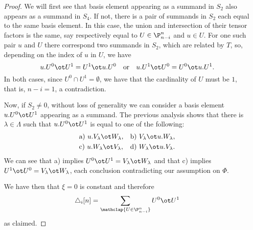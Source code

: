 \begin{proof}
	We will first see that basis element appearing as a summand in $S_2$ also appears as a summand in $S_4$.
	If not, there is a pair of summands in $S_2$ each equal to the same basis element.
	In this case, the union and intersection of their tensor factors is the same, say respectively equal to $U \in \P_{n-i}^n$ and $u \in U$.
	For one such pair $u$ and $U$ there correspond two summands in $S_2$, which are related by $T$, so, depending on the index of $u$ in $U$, we have
	\[
	u.U^0 \ot U^1 = U^1 \ot u.U^0 \quad \text{or} \quad
	u.U^1 \ot U^0 = U^0 \ot u.U^1.
	\]
	In both cases, since $U^0 \cap U^1 = \emptyset$, we have that the cardinality of $U$ must be $1$, that is, $n-i = 1$, a contradiction.

	Now, if $S_2 \neq 0$, without loss of generality we can consider a basis element $u.U^0 \ot U^1$ appearing as a summand.
	The previous analysis shows that there is $\lambda \in \Lambda$ such that $u.U^0 \ot U^1$ is equal to one of the following:
	\begin{align*}
		&\text{a) } u.V_\lambda \ot W_\lambda, &\text{b) }& V_\lambda \ot u.W_\lambda, \\
		&\text{c) } u.W_\lambda \ot V_\lambda, &\text{d) }& W_\lambda \ot u.V_\lambda.
	\end{align*}
	We can see that a) implies $U^0 \ot U^1 = V_\lambda \ot W_\lambda$ and that c) implies $U^1 \ot U^0 = V_\lambda \ot W_\lambda$, each conclusion contradicting our assumption on $\Phi$.

	We have then that $\xi = 0$ is constant and therefore
	\[
	\triangle_i [n] =
	\sum_{\mathclap{U \in \P_{n-i}^n}} U^0 \ot U^1
	\]
	as claimed.
\end{proof}

